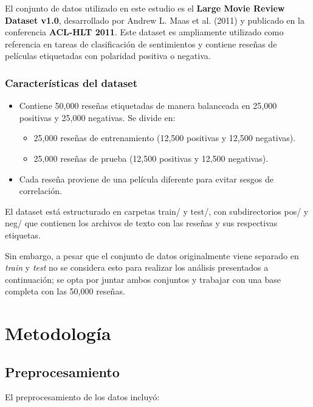 \documentclass[conference]{IEEEtran}
\begin{document}
El conjunto de datos utilizado en este estudio es el \textbf{Large Movie Review Dataset v1.0}, desarrollado por Andrew L. Maas et al. (2011) y publicado en la conferencia \textbf{ACL-HLT 2011}. Este dataset es ampliamente utilizado como referencia en tareas de clasificación de sentimientos y contiene reseñas de películas etiquetadas con polaridad positiva o negativa.

\subsubsection{Características del dataset}

\begin{itemize}

	\item Contiene 50,000 reseñas etiquetadas de manera balanceada en 25,000 positivas y 25,000 negativas. Se divide en:
		\begin{itemize}
		\item 25,000 reseñas de entrenamiento (12,500 positivas y 12,500 negativas).
		\item 25,000 reseñas de prueba (12,500 positivas y 12,500 negativas).
		\end{itemize}
	
	\item Cada reseña proviene de una película diferente para evitar sesgos de correlación.
	
\end{itemize}

El dataset está estructurado en carpetas train/ y test/, con subdirectorios pos/ y neg/ que contienen los archivos de texto con las reseñas y sus respectivas etiquetas.

Sin embargo, a pesar que el conjunto de datos originalmente viene separado en \textit{train} y \textit{test} no se considera esto para realizar los análisis presentados a continuación; se opta por juntar ambos conjuntos y trabajar con una base completa con las 50,000 reseñas.



\section{Metodología}

\subsection{Preprocesamiento}

El preprocesamiento de los datos incluyó:
\end{document}

